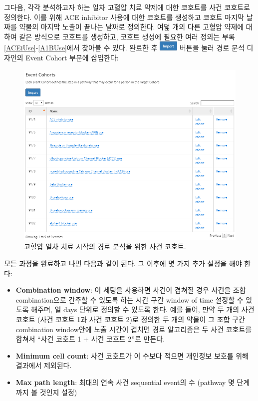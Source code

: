 \documentclass[10.5pt]{book}
\providecommand{\tightlist}{%
  \setlength{\itemsep}{0pt}\setlength{\parskip}{0pt}}
\theoremstyle{definition}
\theoremstyle{definition}
\theoremstyle{definition}
\theoremstyle{remark}
\begin{document}
그다음, 각각 분석하고자 하는 일차 고혈압 치료 약제에 대한 코호트를 사건
코호트로 정의한다. 이를 위해 ACE inhibitor 사용에 대한 코호트를 생성하고
코호트 마지막 날짜를 약물의 마지막 노출이 끝나는 날짜로 정의한다. 여덟
개의 다른 고혈압 약제에 대하여 같은 방식으로 코호트를 생성하고, 코호트
생성에 필요한 여러 정의는 부록 \ref{ACEiUse}-\ref{A1BUse}에서 찾아볼 수
있다. 완료한 후
\includegraphics{images/Characterization/atlasImportButton.png} 버튼을
눌러 경로 분석 디자인의 Event Cohort 부분에 삽입한다:

\begin{figure}

{\centering \includegraphics[width=1\linewidth]{images/Characterization/atlasPathwaysEventCohorts} 

}

\caption{고혈압 일차 치료 시작의 경로 분석을 위한 사건 코호트.}\label{fig:atlasPathwaysEventCohorts}
\end{figure}

모든 과정을 완료하고 나면 다음과 같이 된다. 그 이후에 몇 가지 추가
설정을 해야 한다:

\begin{itemize}
\tightlist
\item
  \textbf{Combination window}: 이 세팅을 사용하면 사건이 겹쳐질 경우
  사건을 조합 combination으로 간주할 수 있도록 하는 시간 구간 window of
  time 설정할 수 있도록 해주며, 일 days 단위로 정의할 수 있도록 한다.
  예를 들어, 만약 두 개의 사건 코호트 (사건 코호트 1과 사건 코호트 2)로
  정의한 두 개의 약물이 그 조합 구간 combination window안에 노출 시간이
  겹치면 경로 알고리즘은 두 사건 코호트를 합쳐서 ``사건 코호트 1 + 사건
  코호트 2''로 만든다.
\item
  \textbf{Minimum cell count}: 사건 코호트가 이 수보다 적으면 개인정보
  보호를 위해 결과에서 제외된다.
\item
  \textbf{Max path length}: 최대의 연속 사건 sequential event의 수
  (pathway 몇 단계까지 볼 것인지 설정)
\end{itemize}
\end{document}
